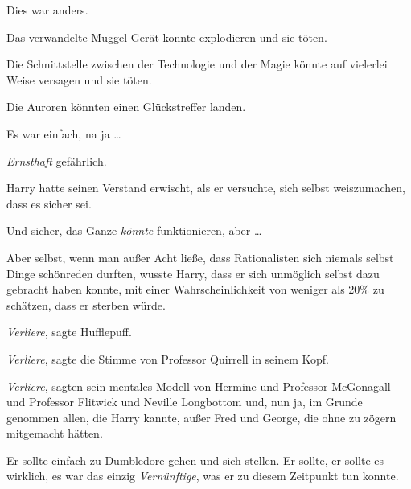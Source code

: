 Dies war anders.

Das verwandelte Muggel-Gerät konnte explodieren und sie töten.

Die Schnittstelle zwischen der Technologie und der Magie könnte auf vielerlei Weise versagen und sie töten.

Die Auroren könnten einen Glückstreffer landen.

Es war einfach, na ja …

\emph{Ernsthaft} gefährlich.

Harry hatte seinen Verstand erwischt, als er versuchte, sich selbst weiszumachen, dass es sicher sei.

Und sicher, das Ganze \emph{könnte} funktionieren, aber …

Aber selbst, wenn man außer Acht ließe, dass Rationalisten sich niemals selbst Dinge schönreden durften, wusste Harry, dass er sich unmöglich selbst dazu gebracht haben konnte, mit einer Wahrscheinlichkeit von weniger als 20\% zu schätzen, dass er sterben würde.

\emph{Verliere}, sagte Hufflepuff.

\emph{Verliere}, sagte die Stimme von Professor Quirrell in seinem Kopf.

\emph{Verliere}, sagten sein mentales Modell von Hermine und Professor McGonagall und Professor Flitwick und Neville Longbottom und, nun ja, im Grunde genommen allen, die Harry kannte, außer Fred und George, die ohne zu zögern mitgemacht hätten.

Er sollte einfach zu Dumbledore gehen und sich stellen. Er sollte, er sollte es wirklich, es war das einzig \emph{Vernünftige}, was er zu diesem Zeitpunkt tun konnte.

